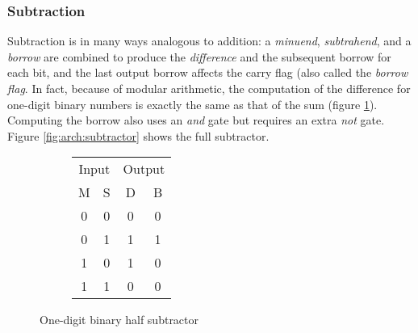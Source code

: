 \subsubsection{Subtraction}

\label{subsubsec:arch:sub}

Subtraction is in many ways analogous to addition: a \textit{minuend},
\textit{subtrahend}, and a \textit{borrow} are combined to produce the
\textit{difference} and the subsequent borrow for each bit, and the last output
borrow affects the carry flag (also called the \textit{borrow flag}.  In fact,
because of modular arithmetic, the computation of the difference for one-digit
binary numbers is exactly the same as that of the sum (figure
\ref{fig:arch:half_subtractor}).  Computing the borrow also uses an \textit{and}
gate but requires an extra \textit{not} gate.  Figure \ref{fig:arch:subtractor}
shows the full subtractor\footnotemark.


\begin{figure}[ht]
    \centering
    \begin{subfigure}[h]{0.3\textwidth}
        \begin{tabular}{cc|cc}
            \multicolumn{2}{c|}{Input} &
            \multicolumn{2}{c}{Output} \\
            M & S & D & B \\
            \hline
            0 & 0 & 0 & 0 \\
            0 & 1 & 1 & 1 \\
            1 & 0 & 1 & 0 \\
            1 & 1 & 0 & 0 \\
        \end{tabular}
    \end{subfigure}
    \begin{subfigure}[h]{0.3\textwidth}
        
    \end{subfigure}
    \caption{One-digit binary half subtractor}
    \label{fig:arch:half_subtractor}
\end{figure}

